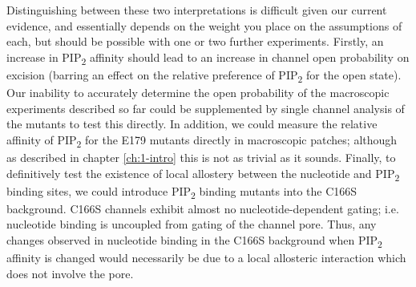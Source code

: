Distinguishing between these two interpretations is difficult given our current evidence, and essentially depends on the weight you place on the assumptions of each, but should be possible with one or two further experiments.
Firstly, an increase in PIP\textsubscript{2} affinity should lead to an increase in channel open probability on excision (barring an effect on the relative preference of PIP\textsubscript{2} for the open state).
Our inability to accurately determine the open probability of the macroscopic experiments described so far could be supplemented by single channel analysis of the mutants to test this directly.
In addition, we could measure the relative affinity of PIP\textsubscript{2} for the E179 mutants directly in macroscopic patches; although as described in chapter \ref{ch:1-intro} this is not as trivial as it sounds.
Finally, to definitively test the existence of local allostery between the nucleotide and PIP\textsubscript{2} binding sites, we could introduce PIP\textsubscript{2} binding mutants into the C166S background.
C166S channels exhibit almost no nucleotide-dependent gating; i.e. nucleotide binding is uncoupled from gating of the channel pore.
Thus, any changes observed in nucleotide binding in the C166S background when PIP\textsubscript{2} affinity is changed would necessarily be due to a local allosteric interaction which does not involve the pore.


